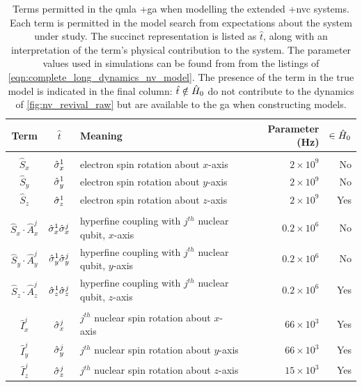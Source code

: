 \par 

\setlength{\tabcolsep}{6.5pt}
\begin{table}[t]
    \begin{tabular}{cclrr}
        Term & $\hat{t}$ & Meaning & Parameter (Hz) & $ \in \hat{H}_0$ \\
        \hline
        \\
        $\hat{S}_x$ & $\hat{\sigma}_{x}^1$ & electron spin rotation about $x$-axis & $ 2\times 10^9 $ & No \\
        $\hat{S}_y$ & $\hat{\sigma}_{y}^1$ & electron spin rotation about $y$-axis & $ 2\times 10^9 $ & No \\
        $\hat{S}_z$ & $\hat{\sigma}_{z}^1$ & electron spin rotation about $z$-axis & $ 2\times 10^9 $ & Yes \\
        \\
        $\hat{S}_x \cdot \hat{A}_x^j$ & $\hat{\sigma}_{x}^1 \hat{\sigma}_{x}^j$ & hyperfine coupling with $j^{th}$ nuclear qubit, $x$-axis & $ 0.2 \times 10^6 $ & No \\
        $\hat{S}_y \cdot \hat{A}_y^j$ & $\hat{\sigma}_{y}^1 \hat{\sigma}_{y}^j$ & hyperfine coupling with $j^{th}$ nuclear qubit, $y$-axis & $ 0.2 \times 10^6 $ & No \\
        $\hat{S}_z \cdot \hat{A}_z^j$ & $\hat{\sigma}_{z}^1 \hat{\sigma}_{z}^j$ & hyperfine coupling with $j^{th}$ nuclear qubit, $z$-axis & $ 0.2 \times 10^6 $ & Yes \\
        \\
        $\hat{I}_x^j$ & $\hat{\sigma}_{x}^j$ & $j^{th}$ nuclear spin rotation about $x$-axis & $ 66\times 10^3$ & Yes \\
        $\hat{I}_y^j$ & $\hat{\sigma}_{y}^j$ & $j^{th}$ nuclear spin rotation about $y$-axis & $ 66\times 10^3 $ & Yes \\
        $\hat{I}_z^j$ & $\hat{\sigma}_{z}^j$ & $j^{th}$ nuclear spin rotation about $z$-axis & $ 15\times 10^3 $ & Yes \\
        \hline 
    \end{tabular}
    \caption[Terms permitted in the QMLA genetic algorithm when modelling the extended nitrogen-vacancy centre systems]{
        Terms permitted in the \gls{qmla} \glsxtrfull+{ga} when modelling the extended \glsxtrlong+{nvc} systems.
        Each term is permitted in the \gls{model search} from expectations about the system under study. 
        The succinct representation is listed as $\hat{t}$, along with an interpretation of the term's physical contribution to the system. 
        The parameter values used in simulations can be found from from the listings of \cref{eqn:complete_long_dynamics_nv_model}. 
        The presence of the term in the \gls{true model} is indicated in the final column: 
            $\hat{t}\notin\hat{H}_0$ do not contribute to the dynamics of \cref{fig:nv_revival_raw} 
            but are available to the \gls{ga} when constructing models.
    }
    \label{table:nv_gen_alg_term_params}
\end{table}


